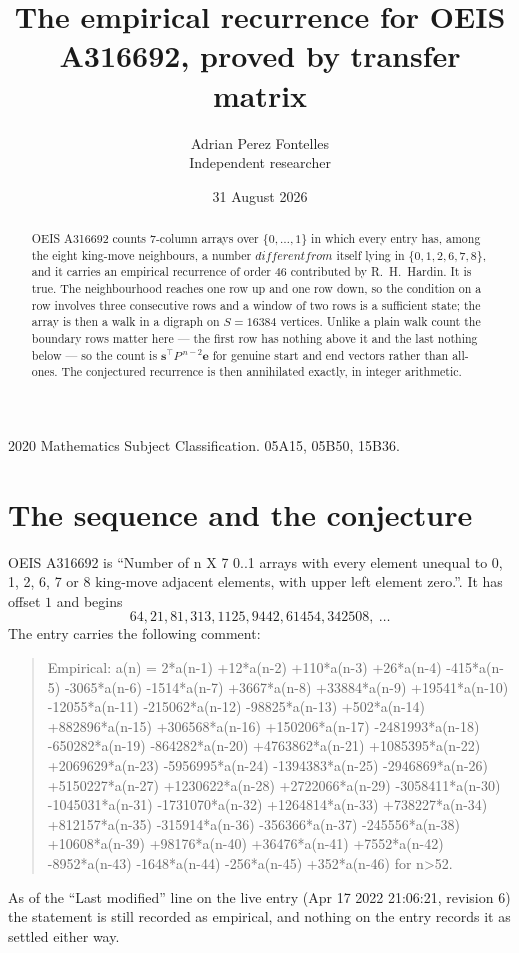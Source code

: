 \documentclass[11pt,a4paper]{article}
\title{The empirical recurrence for OEIS A316692, proved by transfer matrix}
\author{Adrian Perez Fontelles\\ \small Independent researcher}
\date{31 August 2026}
\theoremstyle{plain}
\theoremstyle{definition}
\begin{document}
\maketitle

\begin{abstract}
OEIS A316692 counts $7$-column arrays over $\{0,\dots,1\}$ in which every entry has,
among the eight king-move neighbours, a number $different from$ itself lying in $\{0,1,2,6,7,8\}$, and it carries an empirical
recurrence of order $46$ contributed by R.~H.~Hardin. It is true. The neighbourhood
reaches one row up and one row down, so the condition on a row involves three consecutive
rows and a window of two rows is a sufficient state; the array is then a walk in a digraph
on $S=16384$ vertices. Unlike a plain walk count the boundary rows matter here --- the first
row has nothing above it and the last nothing below --- so the count is
$\mathbf{s}^{\!\top}P^{\,n-2}\mathbf{e}$ for genuine start and end vectors rather than
all-ones. The conjectured recurrence is then annihilated exactly, in integer arithmetic.
\end{abstract}

\noindent\small 2020 Mathematics Subject Classification. 05A15, 05B50, 15B36.\normalsize

\section{The sequence and the conjecture}

OEIS A316692 is ``Number of n X 7 0..1 arrays with every element unequal to 0, 1, 2, 6, 7 or 8 king-move adjacent elements, with upper left element zero.''. It has offset
$1$ and begins
\[
64, 21, 81, 313, 1125, 9442, 61454, 342508,\ \dots
\]
The entry carries the following comment:
\begin{quote}\small
Empirical: a(n) = 2*a(n-1) +12*a(n-2) +110*a(n-3) +26*a(n-4) -415*a(n-5) -3065*a(n-6) -1514*a(n-7) +3667*a(n-8) +33884*a(n-9) +19541*a(n-10) -12055*a(n-11) -215062*a(n-12) -98825*a(n-13) +502*a(n-14) +882896*a(n-15) +306568*a(n-16) +150206*a(n-17) -2481993*a(n-18) -650282*a(n-19) -864282*a(n-20) +4763862*a(n-21) +1085395*a(n-22) +2069629*a(n-23) -5956995*a(n-24) -1394383*a(n-25) -2946869*a(n-26) +5150227*a(n-27) +1230622*a(n-28) +2722066*a(n-29) -3058411*a(n-30) -1045031*a(n-31) -1731070*a(n-32) +1264814*a(n-33) +738227*a(n-34) +812157*a(n-35) -315914*a(n-36) -356366*a(n-37) -245556*a(n-38) +10608*a(n-39) +98176*a(n-40) +36476*a(n-41) +7552*a(n-42) -8952*a(n-43) -1648*a(n-44) -256*a(n-45) +352*a(n-46) for n>52.
\end{quote}
As of the ``Last modified'' line on the live entry (Apr 17 2022 21:06:21, revision
6) the statement is still recorded as empirical, and nothing on the entry
records it as settled either way.
\end{document}
